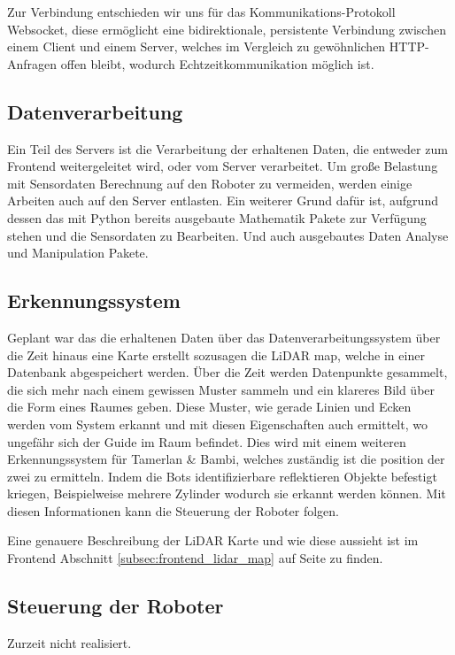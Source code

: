 Zur Verbindung entschieden wir uns für das Kommunikations-Protokoll Websocket, 
diese ermöglicht eine bidirektionale, 
persistente Verbindung zwischen einem Client und einem Server,
welches im Vergleich zu gewöhnlichen HTTP-Anfragen offen bleibt, 
wodurch Echtzeitkommunikation möglich ist.

\subsection{Datenverarbeitung}
Ein Teil des Servers ist die Verarbeitung der erhaltenen Daten, 
die entweder zum Frontend weitergeleitet wird, oder vom Server verarbeitet.
% 
Um große Belastung mit Sensordaten Berechnung auf den Roboter zu vermeiden,
werden einige Arbeiten auch auf den Server entlasten.
Ein weiterer Grund dafür ist, aufgrund dessen das mit Python 
bereits ausgebaute Mathematik Pakete zur Verfügung stehen
und die Sensordaten zu Bearbeiten.
Und auch ausgebautes Daten Analyse und Manipulation Pakete.


\subsection{Erkennungssystem}
Geplant war das die erhaltenen Daten über das Datenverarbeitungssystem 
über die Zeit hinaus eine Karte erstellt sozusagen die LiDAR map,
welche in einer Datenbank abgespeichert werden.
% 
Über die Zeit werden Datenpunkte gesammelt, 
die sich mehr nach einem gewissen Muster sammeln 
und ein klareres Bild über die Form eines Raumes geben.
Diese Muster, wie gerade Linien und Ecken werden vom System erkannt
und mit diesen Eigenschaften auch ermittelt, 
wo ungefähr sich der Guide im Raum befindet.
% 
Dies wird mit einem weiteren Erkennungssystem für Tamerlan \& Bambi,
welches zuständig ist die position der zwei zu ermitteln.
Indem die Bots identifizierbare reflektieren Objekte befestigt kriegen,
Beispielweise mehrere Zylinder wodurch sie erkannt werden können.
%
Mit diesen Informationen kann die Steuerung der Roboter folgen.

Eine genauere Beschreibung der LiDAR Karte und wie diese aussieht
ist im Frontend Abschnitt \ref{subsec:frontend_lidar_map} 
auf Seite \pageref{subsec:frontend_lidar_map} zu finden.

\subsection{Steuerung der Roboter}
\label{subsec:backend_robot_detection}
Zurzeit nicht realisiert.


